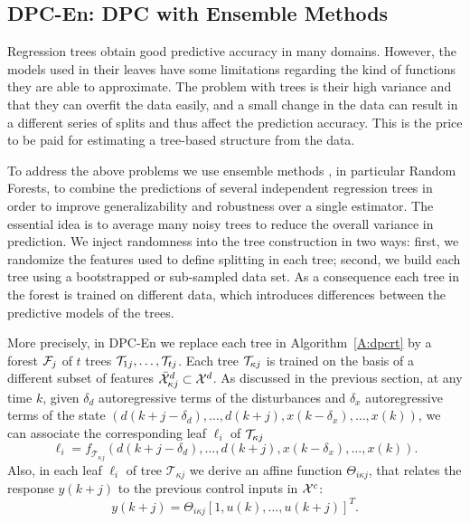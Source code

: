 \subsection{DPC-En: DPC with Ensemble Methods}

\label{SS:dpcrf}

\textcolor[rgb]{0,0,1}{Regression trees obtain good predictive accuracy in many domains. However, the models used in their leaves have some limitations regarding the kind of functions they are able to approximate. The problem with trees is their high variance and that they can overfit the data easily, and a small change in the data can result in a different series of splits and thus affect the prediction accuracy. This is the price to be paid for estimating a tree-based structure from the data.}

\textcolor[rgb]{0,0,1}{To address the above problems we use ensemble methods \cite{Friedman2001}, in particular Random Forests, to combine the predictions of several independent regression trees in order to improve generalizability and robustness over a single estimator. The essential idea is to average many noisy trees to reduce the overall variance in prediction. We inject randomness into the tree construction in two ways: first, we randomize the features used to define splitting in each tree; second, we build each tree using a bootstrapped or sub-sampled data set. As a consequence each tree in the forest is trained on different data, which introduces differences between the predictive models of the trees.}

\textcolor[rgb]{0,0,1}{More precisely, in DPC-En we replace each tree in Algorithm~\ref{A:dpcrt} by a forest $\mathcal{F}_j$ of $t$ trees $\mathcal{T}_{1j},\ldots,\mathcal{T}_{tj}$. Each tree $\mathcal{T}_{\kappa j}$ is trained on the basis of a different subset of features $\bar{\mathcal{X}}^d_{\kappa j} \subset \mathcal{X}^d$. As discussed in the previous section, at any time $k$, given $\delta_d$ autoregressive terms of the disturbances and $\delta_x$ autoregressive terms of the state $\left( d(k+j-\delta_d),\ldots,d(k+j),x(k-\delta_x),\ldots,x(k) \right)$, we can associate the corresponding leaf $\ell_i$ of $\mathcal{T}_{\kappa j}$
\begin{equation}\label{E:model_forest}
	\ell_i = \mathit{f}_{\mathcal{T}_{\kappa j}} \left( d(k+j-\delta_d),\ldots,d(k+j),x(k-\delta_x),\ldots,x(k)  \right).
\end{equation}
Also, in each leaf $\ell_i$ of tree $\mathcal{T}_{\kappa j}$ we derive an affine function $\Theta_{i \kappa j}$, that relates the response $y(k+j)$ to the previous control inputs in $\mathcal{X}^c$:
\begin{equation}\label{E:model_leaf_forest}
	y(k+j) =  \Theta_{i \kappa j} [1,u(k),\ldots,u(k+j) ]^T.
\end{equation}
}

